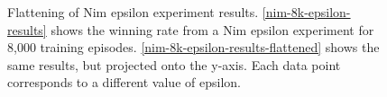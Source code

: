 \documentclass[11pt,a4paper]{report}
\begin{document}
\begin{figure}[htbp]
    \centering
    \caption{Flattening of Nim epsilon experiment results. \ref{nim-8k-epsilon-results} shows the winning rate from a Nim epsilon experiment for 8,000 training episodes. \ref{nim-8k-epsilon-results-flattened} shows the same results, but projected onto the y-axis. Each data point corresponds to a different value of epsilon.}
    \label{nim-epsilon-flattening}
\end{figure}
\end{document}
